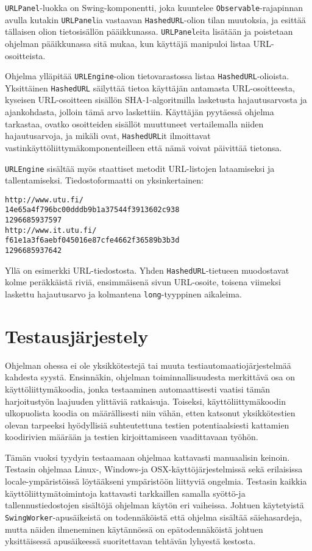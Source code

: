 \documentclass{itlaitos}
\begin{document}
\texttt{URLPanel}-luokka on Swing-komponentti, joka kuuntelee \texttt{Observable}-rajapinnan avulla kutakin \texttt{URLPanel}ia vastaavan \texttt{HashedURL}-olion tilan muutoksia, ja esittää tällaisen olion tietosisällön pääikkunassa. \texttt{URLPanel}eita lisätään ja poistetaan ohjelman pääikkunassa sitä mukaa, kun käyttäjä manipuloi listaa URL-osoitteista.

Ohjelma ylläpitää \texttt{URLEngine}-olion tietovarastossa listaa \texttt{HashedURL}-olioista. Yksittäinen \texttt{HashedURL} säilyttää tietoa käyttäjän antamasta URL-osoitteesta, kyseisen URL-osoitteen sisällön SHA-1-algoritmilla lasketusta hajautusarvosta ja ajankohdasta, jolloin tämä arvo laskettiin. Käyttäjän pyytäessä ohjelma tarkastaa, ovatko osoitteiden sisällöt muuttuneet vertailemalla niiden hajautusarvoja, ja mikäli ovat, \texttt{HashedURL}it ilmoittavat vastinkäyttöliittymäkomponenteilleen että nämä voivat päivittää tietonsa.

\texttt{URLEngine} sisältää myös staattiset metodit URL-listojen lataamiseksi ja tallentamiseksi. Tiedostoformaatti on yksinkertainen:
\begin{verbatim}
http://www.utu.fi/
14e65a4f796bc00dddb9b1a37544f3913602c938
1296685937597
http://www.it.utu.fi/
f61e1a3f6aebf045016e87cfe4662f36589b3b3d
1296685937642
\end{verbatim}
Yllä on esimerkki URL-tiedostosta. Yhden \texttt{HashedURL}-tietueen muodostavat kolme peräkkäistä riviä, ensimmäisenä sivun URL-osoite, toisena viimeksi laskettu hajautusarvo ja kolmantena \texttt{long}-tyyppinen aikaleima.

\section{Testausjärjestely}
Ohjelman ohessa ei ole yksikkötestejä tai muuta testiautomaatiojärjestelmää kahdesta syystä. Ensinnäkin, ohjelman toiminnallisuudesta merkittävä osa on käyttöliittymäkoodia, jonka testaaminen automaattisesti vaatisi tämän harjoitustyön laajuuden ylittäviä ratkaisuja. Toiseksi, käyttöliittymäkoodin ulkopuolista koodia on määrällisesti niin vähän, etten katsonut yksikkötestien olevan tarpeeksi hyödyllisiä suhteutettuna testien potentiaalsiesti kattamien koodirivien määrään ja testien kirjoittamiseen vaadittavaan työhön.

Tämän vuoksi tyydyin testaamaan ohjelmaa kattavasti manuaalisin keinoin. Testasin ohjelmaa Linux-, Windows-ja OSX-käyttöjärjestelmissä sekä erilaisissa locale-ympäristöissä löytääkseni ympäristöön liittyviä ongelmia. Testasin kaikkia käyttöliittymätoimintoja kattavasti tarkkaillen samalla syöttö-ja tallennustiedostojen sisältöjä ohjelman käytön eri vaiheissa. Johtuen käytetyistä \texttt{SwingWorker}-apusäikeistä on todennäköistä että ohjelma sisältää säiehasardeja, mutta näiden ilmeneminen käytännössä on epätodennäköistä johtuen yksittäisessä apusäikeessä suoritettavan tehtävän lyhyestä kestosta.
 
\end{document}
